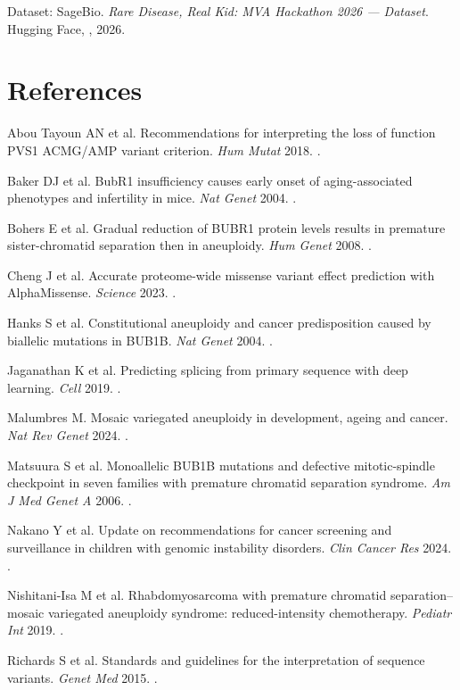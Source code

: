 \documentclass[10pt]{article}
\begin{document}
{\small Dataset: SageBio. \textit{Rare Disease, Real Kid: MVA Hackathon 2026 — Dataset}. Hugging Face,
, 2026.}

\section*{References}
\begin{refs}
\item Abou Tayoun AN et al. Recommendations for interpreting the loss of function PVS1 ACMG/AMP variant criterion. \textit{Hum Mutat} 2018. .
\item Baker DJ et al. BubR1 insufficiency causes early onset of aging-associated phenotypes and infertility in mice. \textit{Nat Genet} 2004. .
\item Bohers E et al. Gradual reduction of BUBR1 protein levels results in premature sister-chromatid separation then in aneuploidy. \textit{Hum Genet} 2008. .
\item Cheng J et al. Accurate proteome-wide missense variant effect prediction with AlphaMissense. \textit{Science} 2023. .
\item Hanks S et al. Constitutional aneuploidy and cancer predisposition caused by biallelic mutations in BUB1B. \textit{Nat Genet} 2004. .
\item Jaganathan K et al. Predicting splicing from primary sequence with deep learning. \textit{Cell} 2019. .
\item Malumbres M. Mosaic variegated aneuploidy in development, ageing and cancer. \textit{Nat Rev Genet} 2024. .
\item Matsuura S et al. Monoallelic BUB1B mutations and defective mitotic-spindle checkpoint in seven families with premature chromatid separation syndrome. \textit{Am J Med Genet A} 2006. .
\item Nakano Y et al. Update on recommendations for cancer screening and surveillance in children with genomic instability disorders. \textit{Clin Cancer Res} 2024. .
\item Nishitani-Isa M et al. Rhabdomyosarcoma with premature chromatid separation–mosaic variegated aneuploidy syndrome: reduced-intensity chemotherapy. \textit{Pediatr Int} 2019. .
\item Richards S et al. Standards and guidelines for the interpretation of sequence variants. \textit{Genet Med} 2015. .

\end{refs}
\end{document}
